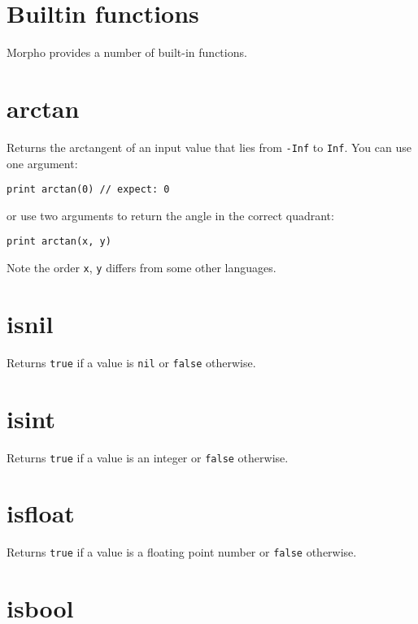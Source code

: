 \hypertarget{builtin-functions}{%
\section{Builtin functions}\label{builtin-functions}}

Morpho provides a number of built-in functions.

\hypertarget{arctan}{%
\section{arctan}\label{arctan}}

Returns the arctangent of an input value that lies from \texttt{-Inf} to
\texttt{Inf}. You can use one argument:

\begin{lstlisting}
print arctan(0) // expect: 0
\end{lstlisting}

or use two arguments to return the angle in the correct quadrant:

\begin{lstlisting}
print arctan(x, y)
\end{lstlisting}

Note the order \texttt{x}, \texttt{y} differs from some other languages.

\hypertarget{isnil}{%
\section{isnil}\label{isnil}}

Returns \texttt{true} if a value is \texttt{nil} or \texttt{false}
otherwise.

\hypertarget{isint}{%
\section{isint}\label{isint}}

Returns \texttt{true} if a value is an integer or \texttt{false}
otherwise.

\hypertarget{isfloat}{%
\section{isfloat}\label{isfloat}}

Returns \texttt{true} if a value is a floating point number or
\texttt{false} otherwise.

\hypertarget{isbool}{%
\section{isbool}\label{isbool}}

